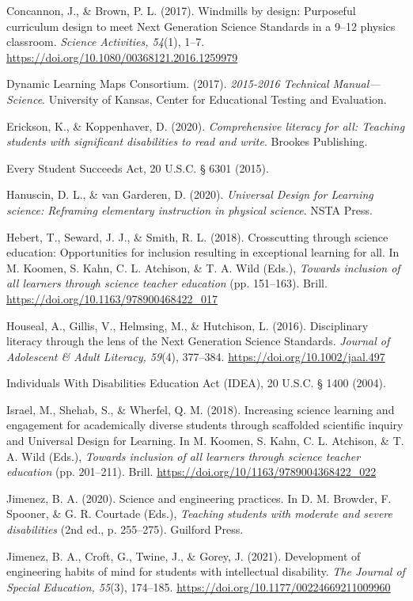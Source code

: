 \documentclass[11.5pt]{sig-alternate} %
\begin{document}
Concannon, J., \& Brown, P. L. (2017). Windmills by design: Purposeful curriculum design to meet Next Generation Science Standards in a 9–12 physics classroom. \textit{Science Activities, 54}(1), 1–7. \url{https://doi.org/10.1080/00368121.2016.1259979}

Dynamic Learning Maps Consortium. (2017). \textit{2015-2016 Technical Manual—Science}. University of Kansas, Center for Educational Testing and Evaluation.

Erickson, K., \& Koppenhaver, D. (2020). \textit{Comprehensive literacy for all: Teaching students with significant disabilities to read and write}. Brookes Publishing. 

Every Student Succeeds Act, 20 U.S.C. § 6301 (2015).

Hanuscin, D. L., \& van Garderen, D. (2020). \textit{Universal Design for Learning science: Reframing elementary instruction in physical science}. NSTA Press.

Hebert, T., Seward, J. J., \& Smith, R. L. (2018). Crosscutting through science education: Opportunities for inclusion resulting in exceptional learning for all. In M. Koomen, S. Kahn, C. L. Atchison, \& T. A. Wild (Eds.), \textit{Towards inclusion of all learners through science teacher education} (pp. 151–163). Brill. \url{https://doi.org/10.1163/978900468422_017}

Houseal, A., Gillis, V., Helmsing, M., \& Hutchison, L. (2016). Disciplinary literacy through the lens of the Next Generation Science Standards. \textit{Journal of Adolescent \& Adult Literacy, 59}(4), 377–384. \url{https://doi.org/10.1002/jaal.497}

Individuals With Disabilities Education Act (IDEA), 20 U.S.C. § 1400 (2004).

Israel, M., Shehab, S., \& Wherfel, Q. M. (2018). Increasing science learning and engagement for academically diverse students through scaffolded scientific inquiry and Universal Design for Learning. In M. Koomen, S. Kahn, C. L. Atchison, \& T. A. Wild (Eds.), \textit{Towards inclusion of all learners through science teacher education} (pp. 201–211). Brill. \url{https://doi.org/10/1163/9789004368422_022}

Jimenez, B. A. (2020). Science and engineering practices. In D. M. Browder, F. Spooner, \& G. R. Courtade (Eds.), \textit{Teaching students with moderate and severe disabilities} (2nd ed., p. 255–275). Guilford Press.

Jimenez, B. A., Croft, G., Twine, J., \& Gorey, J. (2021). Development of engineering habits of mind for students with intellectual disability. \textit{The Journal of Special Education, 55}(3), 174–185. \url{https://doi.org/10.1177/00224669211009960}
\end{document}
